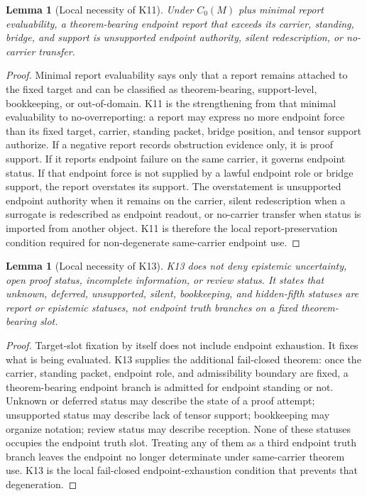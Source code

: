 \documentclass[11pt]{article}
\newtheorem{lemma}[theorem]{Lemma}
\begin{document}
\begin{lemma}[Local necessity of K11]\label{lem:k11-local-necessity}
Under \(C_0(M)\) plus minimal report evaluability, a theorem-bearing endpoint report that exceeds its carrier, standing, bridge, and support is unsupported endpoint authority, silent redescription, or no-carrier transfer.
\end{lemma}
\begin{proof}
Minimal report evaluability says only that a report remains attached to the fixed target and can be classified as theorem-bearing, support-level, bookkeeping, or out-of-domain.  K11 is the strengthening from that minimal evaluability to no-overreporting: a report may express no more endpoint force than its fixed target, carrier, standing packet, bridge position, and tensor support authorize.  If a negative report records obstruction evidence only, it is proof support.  If it reports endpoint failure on the same carrier, it governs endpoint status.  If that endpoint force is not supplied by a lawful endpoint role or bridge support, the report overstates its support.  The overstatement is unsupported endpoint authority when it remains on the carrier, silent redescription when a surrogate is redescribed as endpoint readout, or no-carrier transfer when status is imported from another object.  K11 is therefore the local report-preservation condition required for non-degenerate same-carrier endpoint use.
\end{proof}

\begin{lemma}[Local necessity of K13]\label{lem:k13-local-necessity}
K13 does not deny epistemic uncertainty, open proof status, incomplete information, or review status.  It states that unknown, deferred, unsupported, silent, bookkeeping, and hidden-fifth statuses are report or epistemic statuses, not endpoint truth branches on a fixed theorem-bearing slot.
\end{lemma}
\begin{proof}
Target-slot fixation by itself does not include endpoint exhaustion.  It fixes what is being evaluated.  K13 supplies the additional fail-closed theorem: once the carrier, standing packet, endpoint role, and admissibility boundary are fixed, a theorem-bearing endpoint branch is admitted for endpoint standing or not.  Unknown or deferred status may describe the state of a proof attempt; unsupported status may describe lack of tensor support; bookkeeping may organize notation; review status may describe reception.  None of these statuses occupies the endpoint truth slot.  Treating any of them as a third endpoint truth branch leaves the endpoint no longer determinate under same-carrier theorem use.  K13 is the local fail-closed endpoint-exhaustion condition that prevents that degeneration.
\end{proof}
\end{document}
